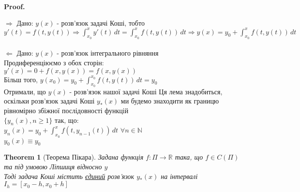 \documentclass[a4paper, 10pt]{article}
\makeatletter
\def\qed{$\blacksquare$}
\def\rightproof{$\boxed{\Rightarrow}$ }
\def\leftproof{$\boxed{\Leftarrow}$ }
\theoremstyle{theoremdd}
\newtheorem{theorem}{Theorem}[subsection]
\theoremstyle{theoremdd}
\theoremstyle{theoremdd}
\theoremstyle{theoremdd}
\theoremstyle{theoremdd}
\theoremstyle{theoremdd}
\theoremstyle{theoremdd}
\theoremstyle{theoremdd}
\renewenvironment{proof}[1][Proof.\\]{\par
\pushQED{\hfill \qed}%
\normalfont \topsep6\p@\@plus6\p@\relax
\trivlist
\item\relax
{\bfseries
#1\@addpunct{.}}\hspace\labelsep\ignorespaces
}{%
\popQED\endtrivlist\@endpefalse
}
\makeatother
\begin{document}
	\begin{proof}
	\rightproof Дано: $y(x)$ - розв'язок задачі Коші, тобто\\
	$\displaystyle y'(t) = f(t,y(t)) \Rightarrow \int_{x_0}^x y'(t)\,dt = \int_{x_0}^x f(t,y(t))\,dt \Rightarrow y(x) = y_0 +  \int_{x_0}^x f(t,y(t))\,dt$
	\\
	\\
	\leftproof Дано: $y(x)$ - розв'язок інтегрального рівняння\\
	Продиференціюємо з обох сторін:\\
	$\displaystyle y'(x) = 0 + f(x,y(x)) = f(x,y(x))$\\
	Більш того, $\displaystyle y(x_0) = y_0 + \int_{x_0}^{x_0} f(t,y(t))\,dt = y_0$\\
	Отримали, що $y(x)$ - розв'язок нашої задачі Коші 
	\end{proof}
	Ця лема знадобиться, оскільки розв'язок задачі Коші $y_*(x)$ ми будемо знаходити як границю рівномірно збіжної послідовності функцій \\$\{y_n(x), n \geq 1\}$ так, що:\\
	$\displaystyle y_n(x) = y_0 + \int_{x_0}^x f(t,y_{n-1}(t))\,dt$  $\forall n \in \mathbb{N}$\\
	$y_0(x) \equiv y_0$
	
	\begin{theorem}[Теорема Пікара]
	Задана функція $f: \Pi \rightarrow \mathbb{R}$ така, що $f \in C(\Pi)$ та під умовою Ліпшиця відносно $y$\\
	Тоді задача Коші містить \underline{єдиний} розв'язок $y_*(x)$ на інтервалі \\ $I_h = [x_0 - h, x_0 + h]$
	\end{theorem}
	
\end{document}
